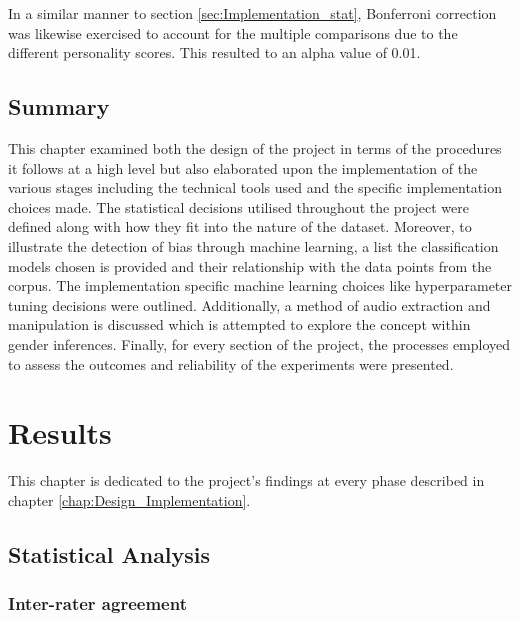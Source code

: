 \documentclass{l4proj}
\begin{document}
In a similar manner to section \ref{sec:Implementation_stat}, Bonferroni correction was likewise exercised to account for the multiple comparisons due to the different personality scores. This resulted to an alpha value of 0.01.

\section{Summary}
This chapter examined both the design of the project in terms of the procedures it follows at a high level but also elaborated upon the implementation of the various stages including the technical tools used and the specific implementation choices made. The statistical decisions utilised throughout the project were defined along with how they fit into the nature of the dataset. Moreover, to illustrate the detection of bias through machine learning, a list the classification models chosen is provided and their relationship with the data points from the corpus. The implementation specific machine learning choices like hyperparameter tuning decisions were outlined. Additionally, a method of audio extraction and manipulation is discussed which is attempted to explore the concept within gender inferences. Finally, for every section of the project, the processes employed to assess the outcomes and reliability of the experiments were presented.
\chapter{Results}\label{chap:Results}
This chapter is dedicated to the project's findings at every phase described in chapter \ref{chap:Design_Implementation}.

\section{Statistical Analysis}

\subsection{Inter-rater agreement}\label{sec:Results_agreement}
\end{document}
